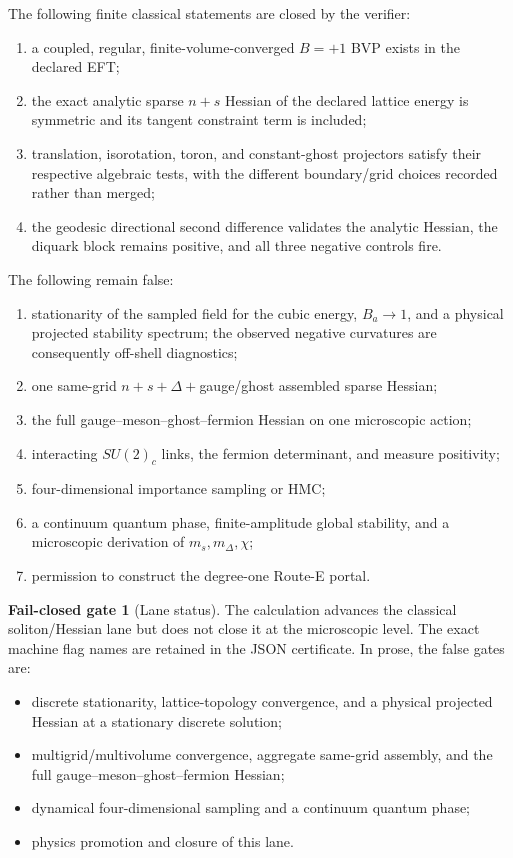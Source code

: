 \documentclass[11pt]{article}
\theoremstyle{definition}
\newtheorem{gate}[proposition]{Fail-closed gate}
\theoremstyle{remark}
\begin{document}
The following finite classical statements are closed by the verifier:
\begin{enumerate}
\item a coupled, regular, finite-volume-converged \(B=+1\) BVP exists in the
declared EFT;
\item the exact analytic sparse \(n+s\) Hessian of the declared lattice energy
is symmetric and its tangent constraint term is included;
\item translation, isorotation, toron, and constant-ghost projectors satisfy
their respective algebraic tests, with the different boundary/grid choices
recorded rather than merged;
\item the geodesic directional second difference validates the analytic
Hessian, the diquark block remains positive, and all three negative controls
fire.
\end{enumerate}

The following remain false:
\begin{enumerate}
\item stationarity of the sampled field for the cubic energy,
\(B_a\to1\), and a physical projected stability spectrum; the observed
negative curvatures are consequently off-shell diagnostics;
\item one same-grid \(n+s+\Delta+\)gauge/ghost assembled sparse Hessian;
\item the full gauge--meson--ghost--fermion Hessian on one microscopic action;
\item interacting \(SU(2)_c\) links, the fermion determinant, and measure
positivity;
\item four-dimensional importance sampling or HMC;
\item a continuum quantum phase, finite-amplitude global stability, and a
microscopic derivation of \(m_s,m_\Delta,\chi\);
\item permission to construct the degree-one Route-E portal.
\end{enumerate}

\begin{gate}[Lane status]
The calculation advances the classical soliton/Hessian lane but does not
close it at the microscopic level.  The exact machine flag names are retained
in the JSON certificate.  In prose, the false gates are:
\begin{itemize}[nosep,leftmargin=2em]
\item discrete stationarity, lattice-topology convergence, and a physical
projected Hessian at a stationary discrete solution;
\item multigrid/multivolume convergence, aggregate same-grid assembly, and
the full gauge--meson--ghost--fermion Hessian;
\item dynamical four-dimensional sampling and a continuum quantum phase;
\item physics promotion and closure of this lane.
\end{itemize}
\end{gate}
\end{document}
